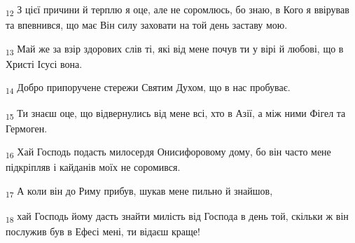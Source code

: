 \begin{tcolorbox}
\textsubscript{12} З цієї причини й терплю я оце, але не соромлюсь, бо знаю, в Кого я ввірував та впевнився, що має Він силу заховати на той день заставу мою.
\end{tcolorbox}
\begin{tcolorbox}
\textsubscript{13} Май же за взір здорових слів ті, які від мене почув ти у вірі й любові, що в Христі Ісусі вона.
\end{tcolorbox}
\begin{tcolorbox}
\textsubscript{14} Добро припоручене стережи Святим Духом, що в нас пробуває.
\end{tcolorbox}
\begin{tcolorbox}
\textsubscript{15} Ти знаєш оце, що відвернулись від мене всі, хто в Азії, а між ними Фігел та Гермоген.
\end{tcolorbox}
\begin{tcolorbox}
\textsubscript{16} Хай Господь подасть милосердя Онисифоровому дому, бо він часто мене підкріпляв і кайданів моїх не соромився.
\end{tcolorbox}
\begin{tcolorbox}
\textsubscript{17} А коли він до Риму прибув, шукав мене пильно й знайшов,
\end{tcolorbox}
\begin{tcolorbox}
\textsubscript{18} хай Господь йому дасть знайти милість від Господа в день той, скільки ж він послужив був в Ефесі мені, ти відаєш краще!
\end{tcolorbox}
